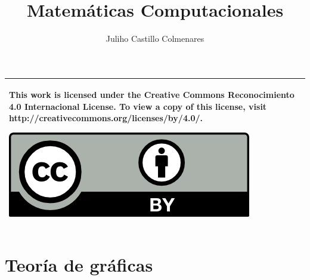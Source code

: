 \documentclass[
]{tufte-book}
\title{Matemáticas Computacionales}
\author{Juliho Castillo Colmenares}
\begin{document}
	\maketitle
\begin{tabular}{|p{}|}
	\hline
	This work is licensed under the Creative Commons Reconocimiento 4.0 Internacional License. To view a copy of this license, visit
	http://creativecommons.org/licenses/by/4.0/.
	\begin{center}
		\includegraphics[scale=1]{./licencia/by.png}
	\end{center}\\
	\hline
\end{tabular}
\tableofcontents

%
%
%
%
%
%
%
%
%
%

\chapter{Teoría de gráficas}




{}

\end{document}
